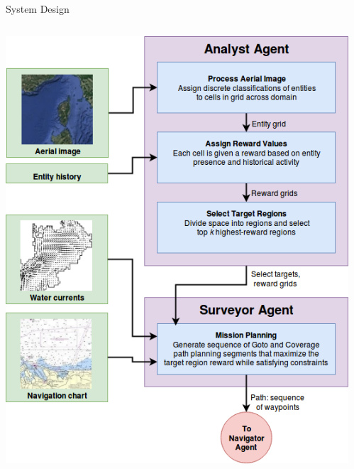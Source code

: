 \documentclass[9pt]{beamer}
\begin{document}
\begin{frame}{System Design}
    \begin{columns}
        \begin{column}{0.5\textwidth}
            \begin{center}
                \includegraphics[width=\textwidth,trim={0cm 0cm 0cm 0cm},clip]{img/system_overview.png}
            \end{center}
        \end{column}
        \begin{column}{0.5\textwidth}
            \begin{center}

\end{center}
\end{column}
\end{columns}
\end{frame}
\end{document}
